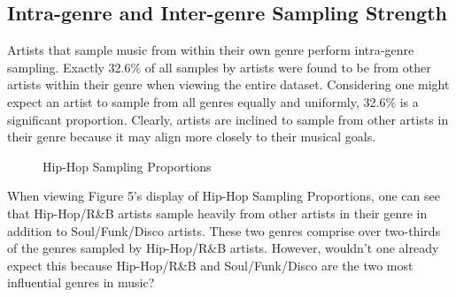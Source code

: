\documentclass[pageno]{jpaper}
\begin{document}
\subsection{Intra-genre and Inter-genre Sampling Strength}
Artists that sample music from within their own genre perform intra-genre sampling. Exactly 32.6\% of all samples by artists were found to be from other artists within their genre when viewing the entire dataset. Considering one might expect an artist to sample from all genres equally and uniformly, 32.6\% is a significant proportion. Clearly, artists are inclined to sample from other artists in their genre because it may align more closely to their musical goals.
\begin{figure}[H]
\caption{Hip-Hop Sampling Proportions}
\label{fig:fig5}
\centering
\end{figure}
When viewing Figure 5's display of Hip-Hop Sampling Proportions, one can see that Hip-Hop/R\&B artists sample heavily from other artists in their genre in addition to Soul/Funk/Disco artists. These two genres comprise over two-thirds of the genres sampled by Hip-Hop/R\&B artists. However, wouldn't one already expect this because Hip-Hop/R\&B and Soul/Funk/Disco are the two most influential genres in music?
\end{document}
